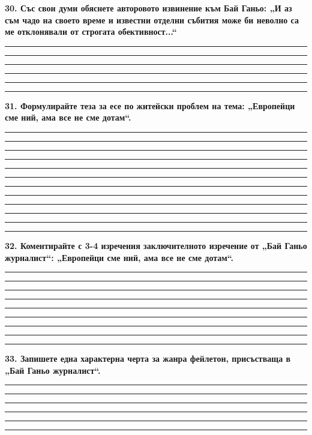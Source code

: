 \documentclass[12pt,a4paper]{article}
\begin{document}
{{{{{{{{{{{{\vspace{0.3cm}

\noindent
\textbf{30. Със свои думи обяснете авторовото извинение към Бай Ганьо: „И аз съм чадо на своето време и известни отделни събития може би неволно са ме отклонявали от строгата обективност...“}

\vspace{0.3cm}

\noindent\rule{\linewidth}{0.4pt}
\noindent\rule{\linewidth}{0.4pt}
\noindent\rule{\linewidth}{0.4pt}
\noindent\rule{\linewidth}{0.4pt}
\noindent\rule{\linewidth}{0.4pt}
\noindent\rule{\linewidth}{0.4pt}

\vspace{0.3cm}

\noindent
\textbf{31. Формулирайте теза за есе по житейски проблем на тема: „Европейци сме ний, ама все не сме дотам“.}

\vspace{0.3cm}

\noindent\rule{\linewidth}{0.4pt}
\noindent\rule{\linewidth}{0.4pt}
\noindent\rule{\linewidth}{0.4pt}
\noindent\rule{\linewidth}{0.4pt}
\noindent\rule{\linewidth}{0.4pt}
\noindent\rule{\linewidth}{0.4pt}
\noindent\rule{\linewidth}{0.4pt}
\noindent\rule{\linewidth}{0.4pt}
\noindent\rule{\linewidth}{0.4pt}
\noindent\rule{\linewidth}{0.4pt}
\noindent\rule{\linewidth}{0.4pt}
\noindent\rule{\linewidth}{0.4pt}

\vspace{0.3cm}

\noindent
\textbf{32. Коментирайте с 3-4 изречения заключителното изречение от „Бай Ганьо журналист“: „Европейци сме ний, ама все не сме дотам“.}

\vspace{0.3cm}

\noindent\rule{\linewidth}{0.4pt}
\noindent\rule{\linewidth}{0.4pt}
\noindent\rule{\linewidth}{0.4pt}
\noindent\rule{\linewidth}{0.4pt}
\noindent\rule{\linewidth}{0.4pt}
\noindent\rule{\linewidth}{0.4pt}
\noindent\rule{\linewidth}{0.4pt}
\noindent\rule{\linewidth}{0.4pt}
\noindent\rule{\linewidth}{0.4pt}

\vspace{0.3cm}

\noindent
\textbf{33. Запишете една характерна черта за жанра фейлетон, присъстваща в „Бай Ганьо журналист“.}

\vspace{0.3cm}

\noindent\rule{\linewidth}{0.4pt}
\noindent\rule{\linewidth}{0.4pt}
\noindent\rule{\linewidth}{0.4pt}
\noindent\rule{\linewidth}{0.4pt}
\noindent\rule{\linewidth}{0.4pt}
\noindent\rule{\linewidth}{0.4pt}

}}}}}}}}}}}}
\end{document}
